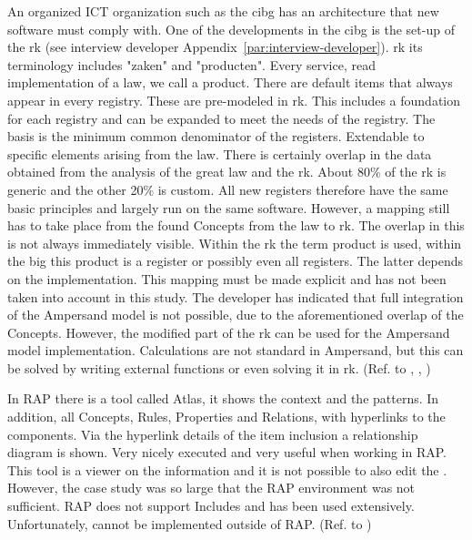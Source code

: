 An organized ICT organization such as the \acrshort{cibg} has an architecture that new software must comply with.
One of the developments in the \acrshort{cibg} is the set-up of the \acrshort{rk} (see interview developer Appendix~\ref{par:interview-developer}).
\acrlong{rk} its terminology includes "zaken" and "producten".
Every service, read implementation of a law, we call a product.
There are default items that always appear in every registry.
These are pre-modeled in \acrshort{rk}.
This includes a foundation for each registry and can be expanded to meet the needs of the registry.
The basis is the minimum common denominator of the registers.
Extendable to specific elements arising from the law.
There is certainly overlap in the data obtained from the analysis of the great law and the \acrshort{rk}.
About 80\% of the \acrshort{rk} is generic and the other 20\% is custom.
All new registers therefore have the same basic principles and largely run on the same software.
However, a mapping still has to take place from the found Concepts from the law to \acrshort{rk}.
The overlap in this is not always immediately visible.
Within the \acrshort{rk} the term product is used, within the \acrshort{big} this product is a register or possibly even all registers.
The latter depends on the implementation.
This mapping must be made explicit and has not been taken into account in this study.
The developer has indicated that full integration of the Ampersand model is not possible, due to the aforementioned overlap of the Concepts.
However, the modified part of the \acrshort{rk} can be used for the Ampersand model implementation.
Calculations are not standard in Ampersand, but this can be solved by writing external functions or even solving it in \acrshort{rk}.
(Ref. to , , )

In RAP there is a tool called Atlas, it shows the context and the patterns.
In addition, all Concepts, Rules, Properties and Relations, with hyperlinks to the components.
Via the hyperlink details of the item inclusion a relationship diagram is shown.
Very nicely executed and very useful when working in RAP.
This tool is a viewer on the information and it is not possible to also edit the .
However, the case study was so large that the RAP environment was not sufficient.
RAP does not support Includes and has been used extensively.
Unfortunately,  cannot be implemented outside of RAP.
(Ref. to )



